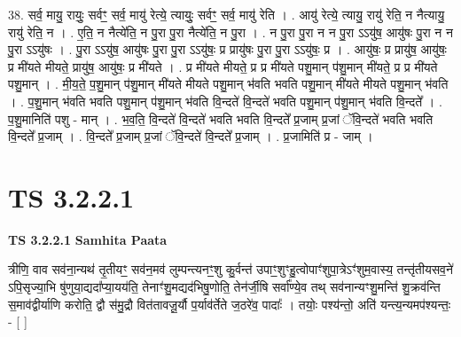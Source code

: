 \documentclass[17pt]{extarticle}
\begin{document}
38. सर्व॒ मायु॒ रायुः॒ सर्वꣳ॒॒ सर्व॒ मायु॑ रेत्ये॒ त्यायुः॒ सर्वꣳ॒॒ सर्व॒ मायु॑ रेति । . आयु॑ रेत्ये॒ त्यायु॒ रायु॑ रेति॒ न नैत्यायु॒ रायु॑ रेति॒ न । . ए॒ति॒ न नैत्ये॑ति॒ न पु॒रा पु॒रा नैत्ये॑ति॒ न पु॒रा । . न पु॒रा पु॒रा न न पु॒रा ऽऽयु॑ष॒ आयु॑षः पु॒रा न न पु॒रा ऽऽयु॑षः । . पु॒रा ऽऽयु॑ष॒ आयु॑षः पु॒रा पु॒रा ऽऽयु॑षः॒ प्र प्रायु॑षः पु॒रा पु॒रा ऽऽयु॑षः॒ प्र । . आयु॑षः॒ प्र प्रायु॑ष॒ आयु॑षः॒ प्र मी॑यते मीयते॒ प्रायु॑ष॒ आयु॑षः॒ प्र मी॑यते । . प्र मी॑यते मीयते॒ प्र प्र मी॑यते पशु॒मान् प॑शु॒मान् मी॑यते॒ प्र प्र मी॑यते पशु॒मान् । . मी॒य॒ते॒ प॒शु॒मान् प॑शु॒मान् मी॑यते मीयते पशु॒मान् भ॑वति भवति पशु॒मान् मी॑यते मीयते पशु॒मान् भ॑वति । . प॒शु॒मान् भ॑वति भवति पशु॒मान् प॑शु॒मान् भ॑वति वि॒न्दते॑ वि॒न्दते॑ भवति पशु॒मान् प॑शु॒मान् भ॑वति वि॒न्दते᳚ । . प॒शु॒मानिति॑ पशु - मान् । . भ॒व॒ति॒ वि॒न्दते॑ वि॒न्दते॑ भवति भवति वि॒न्दते᳚ प्र॒जाम् प्र॒जां ॅवि॒न्दते॑ भवति भवति वि॒न्दते᳚ प्र॒जाम् । . वि॒न्दते᳚ प्र॒जाम् प्र॒जां ॅवि॒न्दते॑ वि॒न्दते᳚ प्र॒जाम् । . प्र॒जामिति॑ प्र - जाम् । \newline
\pagebreak
{}

\section{ TS 3.2.2.1 }

\textbf{TS 3.2.2.1 } \newline
\textbf{Samhita Paata} \newline

त्रीणि॒ वाव सव॑ना॒न्यथ॑ तृ॒तीयꣳ॒॒ सव॑न॒मव॑ लुम्पन्त्यनꣳ॒॒शु कु॒र्वन्त॑ उपाꣳ॒॒शुꣳहु॒त्वोपाꣳ॑शुपा॒त्रेऽꣳ॑शुम॒वास्य॒ तन्तृ॑तीयसव॒ने॑ ऽपि॒सृज्या॒भि षु॑णुया॒द्यदा᳚प्या॒यय॑ति॒ तेनाꣳ॑शु॒मद्यद॑भिषु॒णोति॒ तेन॑र्जी॒षि सर्वा᳚ण्ये॒व तथ् सव॑नान्यꣳशु॒मन्ति॑ शु॒क्रव॑न्ति स॒माव॑द्वीर्याणि करोति॒ द्वौ स॑मु॒द्रौ वित॑तावजू॒र्यौ प॒र्याव॑र्तेते ज॒ठरे॑व॒ पादाः᳚ । तयोः॒ पश्य॑न्तो॒ अति॑ यन्त्य॒न्यमप॑श्यन्तः॒ - [  ] \newline
\end{document}
